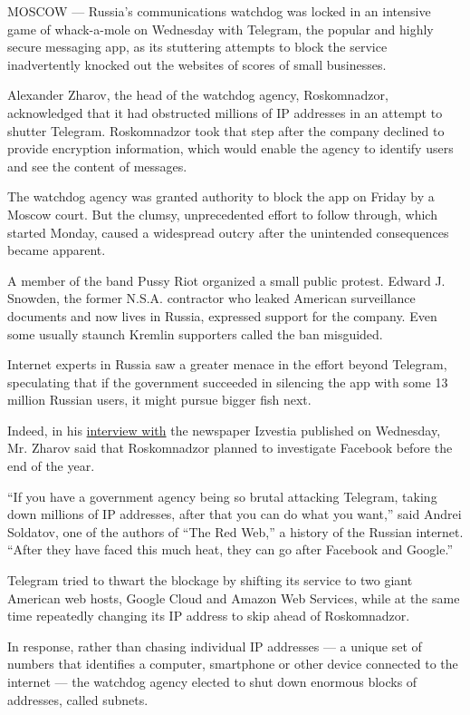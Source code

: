 MOSCOW --- Russia's communications watchdog was locked in an intensive
game of whack-a-mole on Wednesday with Telegram, the popular and highly
secure messaging app, as its stuttering attempts to block the service
inadvertently knocked out the websites of scores of small businesses.

Alexander Zharov, the head of the watchdog agency, Roskomnadzor,
acknowledged that it had obstructed millions of IP addresses in an
attempt to shutter Telegram. Roskomnadzor took that step after the
company declined to provide encryption information, which would enable
the agency to identify users and see the content of messages.

The watchdog agency was granted authority to block the app on Friday by
a Moscow court. But the clumsy, unprecedented effort to follow through,
which started Monday, caused a widespread outcry after the unintended
consequences became apparent.

A member of the band Pussy Riot organized a small public protest. Edward
J. Snowden, the former N.S.A. contractor who leaked American
surveillance documents and now lives in Russia, expressed support for
the company. Even some usually staunch Kremlin supporters called the ban
misguided.

Internet experts in Russia saw a greater menace in the effort beyond
Telegram, speculating that if the government succeeded in silencing the
app with some 13 million Russian users, it might pursue bigger fish
next.

Indeed, in his
\href{https://iz.ru/733380/siuzanna-farizova/so-svobodoi-vse-khorosho-s-otvetstvennostiu-plokho}{interview
with} the newspaper Izvestia published on Wednesday, Mr. Zharov said
that Roskomnadzor planned to investigate Facebook before the end of the
year.

``If you have a government agency being so brutal attacking Telegram,
taking down millions of IP addresses, after that you can do what you
want,'' said Andrei Soldatov, one of the authors of ``The Red Web,'' a
history of the Russian internet. ``After they have faced this much heat,
they can go after Facebook and Google.''

Telegram tried to thwart the blockage by shifting its service to two
giant American web hosts, Google Cloud and Amazon Web Services, while at
the same time repeatedly changing its IP address to skip ahead of
Roskomnadzor.

In response, rather than chasing individual IP addresses --- a unique
set of numbers that identifies a computer, smartphone or other device
connected to the internet --- the watchdog agency elected to shut down
enormous blocks of addresses, called subnets.


